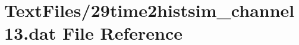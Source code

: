\hypertarget{29time2histsim__channel13_8dat}{}\section{Text\+Files/29time2histsim\+\_\+channel13.dat File Reference}
\label{29time2histsim__channel13_8dat}
